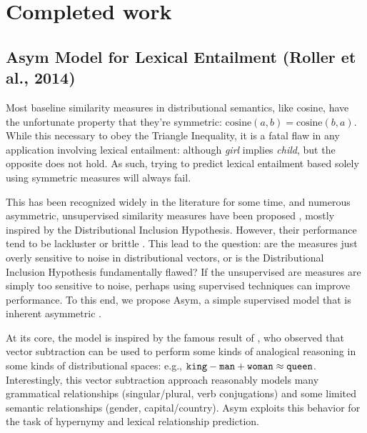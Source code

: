 \documentclass[12pt]{article}
\begin{document}
\section{Completed work}

\subsection{Asym Model for Lexical Entailment (Roller et al., 2014)}
\label{sec:asym}

Most baseline similarity measures in distributional semantics, like cosine,
have the unfortunate property that they're symmetric: $\text{cosine}(a, b) =
\text{cosine}(b, a)$. While this necessary to obey the Triangle Inequality, it
is a fatal flaw in any application involving lexical entailment: although {\em
girl} implies {\em child}, but the opposite does not hold. As such, trying to
predict lexical entailment based solely using symmetric measures will always
fail.

This has been recognized widely in the
literature for some time, and numerous asymmetric, unsupervised similarity measures have been
proposed
\cite{weeds:2003:emnlp,zhitomirsky-geffet:2005:acl,clarke:2009:gems,kotlerman:2010:nle,santus:2013:thesis},
mostly inspired by the Distributional Inclusion Hypothesis. However, their
performance tend to be lackluster \cite{clarke:2009:gems} or brittle
\cite{kotlerman:2010:nle}. This lead to the question: are the measures just
overly sensitive to noise in distributional vectors, or is the Distributional
Inclusion Hypothesis fundamentally flawed? If the unsupervised are measures
are simply too sensitive to noise, perhaps using supervised techniques can
improve performance.  To this end, we propose Asym, a simple supervised model
that is inherent asymmetric \cite{roller:2014:coling}. 

At its core, the model is inspired by the famous result of
, who observed that vector subtraction can be used
to perform some kinds of analogical reasoning in some kinds of distributional
spaces: e.g., ${\tt king} - {\tt man} + {\tt woman} \approx {\tt queen}$.
Interestingly, this vector subtraction approach reasonably models many
grammatical relationships (singular/plural, verb conjugations) and some limited
semantic relationships (gender, capital/country). Asym exploits this
behavior for the task of hypernymy and lexical relationship prediction.
\end{document}
